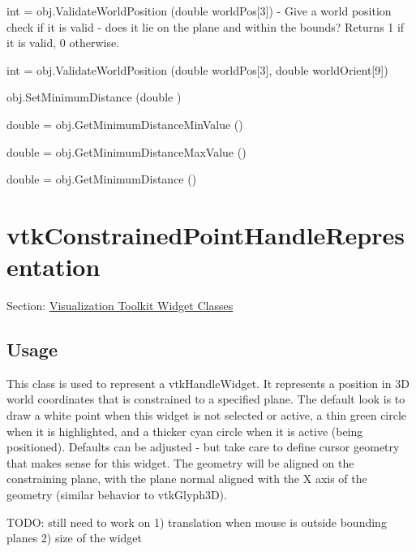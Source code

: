 \begin{DoxyItemize}
\item {\ttfamily int = obj.\-Validate\-World\-Position (double world\-Pos\mbox{[}3\mbox{]})} -\/ Give a world position check if it is valid -\/ does it lie on the plane and within the bounds? Returns 1 if it is valid, 0 otherwise.  
\item {\ttfamily int = obj.\-Validate\-World\-Position (double world\-Pos\mbox{[}3\mbox{]}, double world\-Orient\mbox{[}9\mbox{]})}  
\item {\ttfamily obj.\-Set\-Minimum\-Distance (double )}  
\item {\ttfamily double = obj.\-Get\-Minimum\-Distance\-Min\-Value ()}  
\item {\ttfamily double = obj.\-Get\-Minimum\-Distance\-Max\-Value ()}  
\item {\ttfamily double = obj.\-Get\-Minimum\-Distance ()}  
\end{DoxyItemize}\hypertarget{vtkwidgets_vtkconstrainedpointhandlerepresentation}{}\section{vtk\-Constrained\-Point\-Handle\-Representation}\label{vtkwidgets_vtkconstrainedpointhandlerepresentation}
Section\-: \hyperlink{sec_vtkwidgets}{Visualization Toolkit Widget Classes} \hypertarget{vtkwidgets_vtkxyplotwidget_Usage}{}\subsection{Usage}\label{vtkwidgets_vtkxyplotwidget_Usage}
This class is used to represent a vtk\-Handle\-Widget. It represents a position in 3\-D world coordinates that is constrained to a specified plane. The default look is to draw a white point when this widget is not selected or active, a thin green circle when it is highlighted, and a thicker cyan circle when it is active (being positioned). Defaults can be adjusted -\/ but take care to define cursor geometry that makes sense for this widget. The geometry will be aligned on the constraining plane, with the plane normal aligned with the X axis of the geometry (similar behavior to vtk\-Glyph3\-D).

T\-O\-D\-O\-: still need to work on 1) translation when mouse is outside bounding planes 2) size of the widget

